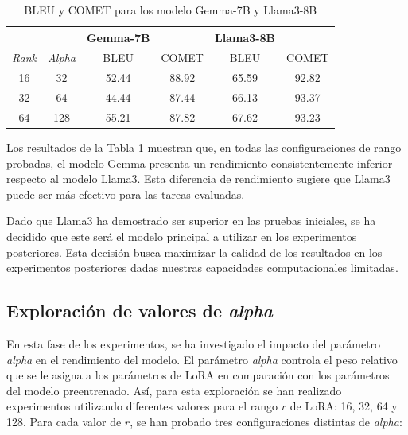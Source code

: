 \documentclass[11pt,spanish,listoffigures,listoftables]{tfgetsinf}
\begin{document}
\begin{table}[!h]
\caption{BLEU y COMET para los modelo Gemma-7B y Llama3-8B}
\begin{center}
\begin{tabular}{ c c c c c c }
	\ & \ & Gemma-7B & \ & Llama3-8B & \ \\
	\hline
	\textit{Rank} & \textit{Alpha} & BLEU & COMET & BLEU & COMET \\
	\hline
	\hline
	16 & 32 & 52.44 & 88.92 & 65.59 & 92.82 \\
	\hline
	32 & 64 & 44.44 & 87.44 & 66.13 & 93.37 \\
	\hline
	64 & 128 & 55.21 & 87.82 & 67.62 & 93.23 \\
	

\end{tabular}
\end{center}
\label{tab: Gemma y Llama}
\end{table}

Los resultados de la Tabla \ref{tab: Gemma y Llama} muestran que, en todas las configuraciones de rango probadas, el modelo Gemma presenta un rendimiento consistentemente inferior respecto al modelo Llama3. Esta diferencia de rendimiento sugiere que Llama3 puede ser más efectivo para las tareas evaluadas.

Dado que Llama3 ha demostrado ser superior en las pruebas iniciales, se ha decidido que este será el modelo principal a utilizar en los experimentos posteriores. Esta decisión busca maximizar la calidad de los resultados en los experimentos posteriores dadas nuestras capacidades computacionales limitadas.

\subsection{Exploración de valores de \textit{alpha}}

En esta fase de los experimentos, se ha investigado el impacto del parámetro \textit{alpha} en el rendimiento del modelo. El parámetro \textit{alpha} controla el peso relativo que se le asigna a los parámetros de LoRA en comparación con los parámetros del modelo preentrenado. Así, para esta exploración se han realizado experimentos utilizando diferentes valores para el rango $r$ de LoRA: 16, 32, 64 y 128. Para cada valor de $r$, se han probado tres configuraciones distintas de \textit{alpha}:
\end{document}
